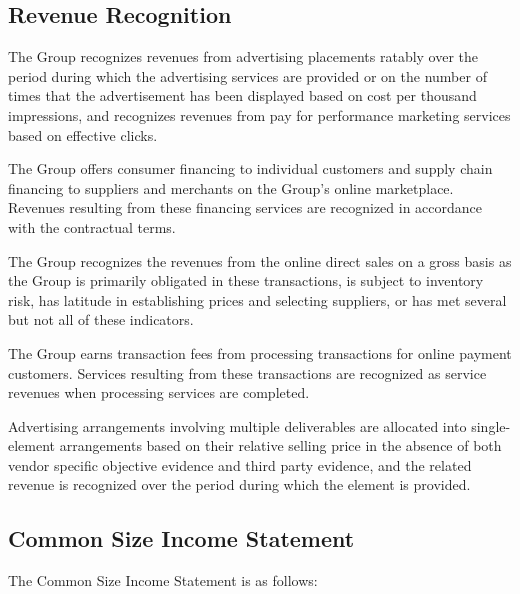 \subsection{Revenue Recognition}

The Group recognizes revenues from advertising placements ratably over the period during which the advertising services are provided or on the number of times that the advertisement has been displayed based on cost per thousand impressions, and recognizes revenues from pay for performance marketing services based on effective clicks.

The Group offers consumer financing to individual customers and supply chain financing to suppliers and merchants on the Group’s online marketplace. Revenues resulting from these financing services are recognized in accordance with the contractual terms.

The Group recognizes the revenues from the online direct sales on a gross basis as the Group is primarily obligated in these transactions, is subject to inventory risk, has latitude in establishing prices and selecting suppliers, or has met several but not all of these indicators.

The Group earns transaction fees from processing transactions for online payment customers. Services resulting from these transactions are recognized as service revenues when processing services are completed.

Advertising arrangements involving multiple deliverables are allocated into single-element arrangements based on their relative selling price in the absence of both vendor specific objective evidence and third party evidence, and the related revenue is recognized over the period during which the element is provided.

\subsection{Common Size Income Statement}
The Common Size Income Statement is as follows:


